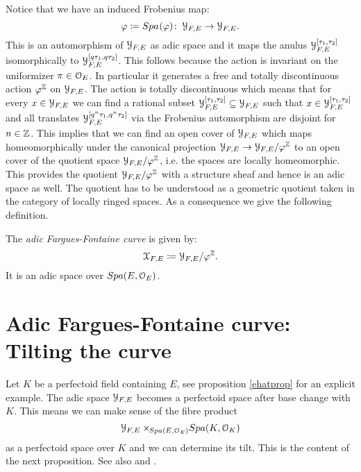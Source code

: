 Notice that we have an induced Frobenius map:
\[\varphi\coloneqq{Spa{\:\!(\varphi)}}\colon\:\mathcal{Y}_{F,E}\to\mathcal{Y}_{F,E}.\]
This is an automorphism of $\mathcal{Y}_{F,E}$ as adic space and it maps the anulus $\mathcal{Y}_{F,E}^{[\tau_1,\tau_2]}$ isomorphically to $\mathcal{Y}_{F,E}^{[q\tau_1,q\tau_2]}$. This follows because the action is invariant on the uniformizer $\pi\in\mathcal{O}_E$.
In particular it generates a free and totally discontinuous action $\varphi^{\mathbb{Z}}$ on $\mathcal{Y}_{F,E}$. The action is totally discontinuous which means that for every $x\in\mathcal{Y}_{F,E}$ we can find a rational subset
$\mathcal{Y}_{F,E}^{[\tau_1,\tau_2]}\subseteq\mathcal{Y}_{F,E}$ such that $x\in\mathcal{Y}_{F,E}^{[\tau_1,\tau_2]}$ and all translates 
$\mathcal{Y}_{F,E}^{[q^n\tau_1,q^n\tau_2]}$ via the Frobenius automorphism are disjoint for $n\in\mathbb{Z}$.
This implies that we can find an open cover of $\mathcal{Y}_{F,E}$ which maps homeomorphically under the canonical projection
$\mathcal{Y}_{F,E}\to\mathcal{Y}_{F,E}/\varphi^{\mathbb{Z}}$ to an open cover of the quotient space $\mathcal{Y}_{F,E}/\varphi^{\mathbb{Z}}$, i.e. the spaces are locally homeomorphic. This provides the quotient $\mathcal{Y}_{F,E}/\varphi^{\mathbb{Z}}$ with a structure sheaf and hence is an adic space as well. The quotient has to be understood as a geometric quotient taken in the category of locally ringed spaces.
As a consequence we give the following definition.
\begin{definition}
The \emph{adic Fargues-Fontaine curve} is given by:
\[\mathcal{X}_{F,E} \coloneqq \mathcal{Y}_{F,E}/\varphi^{\mathbb{Z}}.\]
It is an adic space over ${Spa({E},{\mathcal{O}_E})}$.
\end{definition}



\section{Adic Fargues-Fontaine curve: Tilting the curve}
Let $K$ be a perfectoid field containing $E$,  see proposition \ref{ehatprop} for an explicit example.
The adic space $\mathcal{Y}_{F,E}$ becomes a perfectoid space after base change with $K$.
This means we can make sense of the fibre product
\[\mathcal{Y}_{F,E}\times\!\!_{{Spa({E},{\mathcal{O}_E})}}{Spa({K},{\mathcal{O}_K})}\]
as a perfectoid space over $K$ and we can determine its tilt. This is the content of the next proposition. 
See also \cite[th\'eor\`eme 2.7]{Fargues15} and \cite[proposition II.1.1]{FS2021}.

